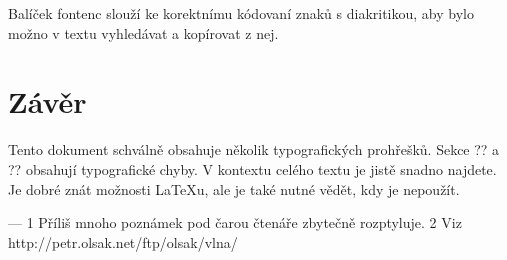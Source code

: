 \documentclass[czech,a4paper,10pt,twocolumn]{article}
\begin{document}
Balíček fontenc slouží ke korektnímu kódovaní znaků s diakritikou, aby bylo možno v textu vyhledávat a kopírovat z nej.

\section{Závěr}

Tento dokument schválně obsahuje několik typografických prohřešků. Sekce ?? a ?? obsahují typografické chyby. V kontextu celého textu je jistě snadno najdete. Je dobré znát možnosti LaTeXu, ale je také nutné vědět, kdy je nepoužít.

---
1 Příliš mnoho poznámek pod čarou čtenáře zbytečně rozptyluje.
2 Viz http://petr.olsak.net/ftp/olsak/vlna/
\end{document}
